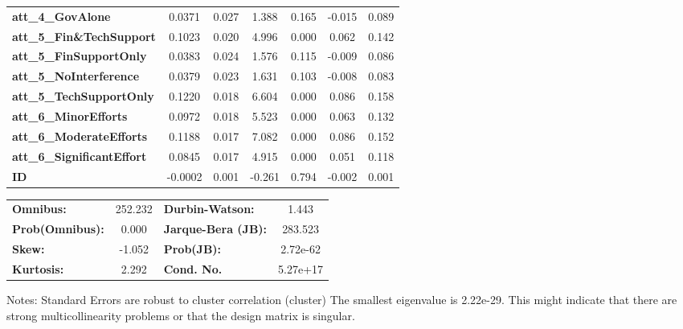 \begin{center}
\begin{tabular}{lcccccc}
\textbf{att\_4\_GovAlone}                   &       0.0371  &        0.027     &     1.388  &         0.165        &       -0.015    &        0.089     \\
\textbf{att\_5\_Fin\&TechSupport}           &       0.1023  &        0.020     &     4.996  &         0.000        &        0.062    &        0.142     \\
\textbf{att\_5\_FinSupportOnly}             &       0.0383  &        0.024     &     1.576  &         0.115        &       -0.009    &        0.086     \\
\textbf{att\_5\_NoInterference}             &       0.0379  &        0.023     &     1.631  &         0.103        &       -0.008    &        0.083     \\
\textbf{att\_5\_TechSupportOnly}            &       0.1220  &        0.018     &     6.604  &         0.000        &        0.086    &        0.158     \\
\textbf{att\_6\_MinorEfforts}               &       0.0972  &        0.018     &     5.523  &         0.000        &        0.063    &        0.132     \\
\textbf{att\_6\_ModerateEfforts}            &       0.1188  &        0.017     &     7.082  &         0.000        &        0.086    &        0.152     \\
\textbf{att\_6\_SignificantEffort}          &       0.0845  &        0.017     &     4.915  &         0.000        &        0.051    &        0.118     \\
\textbf{ID}                                 &      -0.0002  &        0.001     &    -0.261  &         0.794        &       -0.002    &        0.001     \\
\bottomrule
\end{tabular}
\begin{tabular}{lclc}
\textbf{Omnibus:}       & 252.232 & \textbf{  Durbin-Watson:     } &    1.443  \\
\textbf{Prob(Omnibus):} &   0.000 & \textbf{  Jarque-Bera (JB):  } &  283.523  \\
\textbf{Skew:}          &  -1.052 & \textbf{  Prob(JB):          } & 2.72e-62  \\
\textbf{Kurtosis:}      &   2.292 & \textbf{  Cond. No.          } & 5.27e+17  \\
\bottomrule
\end{tabular}
\end{center}

Notes: \newline
 [1] Standard Errors are robust to cluster correlation (cluster) \newline
 [2] The smallest eigenvalue is 2.22e-29. This might indicate that there are \newline
 strong multicollinearity problems or that the design matrix is singular.